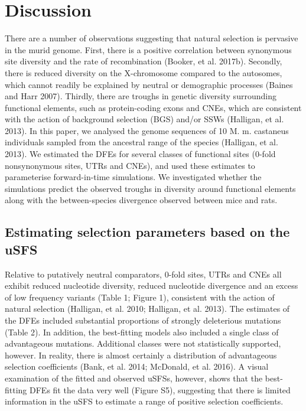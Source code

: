 \section{Discussion}

There are a number of observations suggesting that natural selection is pervasive in the murid genome. First, there is a positive correlation between synonymous site diversity and the rate of recombination (Booker, et al. 2017b). Secondly, there is reduced diversity on the X-chromosome compared to the autosomes, which cannot readily be explained by neutral or demographic processes (Baines and Harr 2007). Thirdly, there are troughs in genetic diversity surrounding functional elements, such as protein-coding exons and CNEs, which are consistent with the action of background selection (BGS) and/or SSWs (Halligan, et al. 2013). In this paper, we analysed the genome sequences of 10 M. m. castaneus individuals sampled from the ancestral range of the species (Halligan, et al. 2013). We estimated the DFEs for several classes of functional sites (0-fold nonsynonymous sites, UTRs and CNEs), and used these estimates to parameterise forward-in-time simulations. We investigated whether the simulations predict the observed troughs in diversity around functional elements along with the between-species divergence observed between mice and rats.

\subsection{Estimating selection parameters based on the uSFS}

	Relative to putatively neutral comparators, 0-fold sites, UTRs and CNEs all exhibit reduced nucleotide diversity, reduced nucleotide divergence and an excess of low frequency variants (Table 1; Figure 1), consistent with the action of natural selection (Halligan, et al. 2010; Halligan, et al. 2013). The estimates of the DFEs included substantial proportions of strongly deleterious mutations (Table 2). In addition, the best-fitting models also included a single class of advantageous mutations. Additional classes were not statistically supported, however. In reality, there is almost certainly a distribution of advantageous selection coefficients (Bank, et al. 2014; McDonald, et al. 2016). A visual examination of the fitted and observed uSFSs, however, shows that the best-fitting DFEs fit the data very well (Figure S5), suggesting that there is limited information in the uSFS to estimate a range of positive selection coefficients. 

